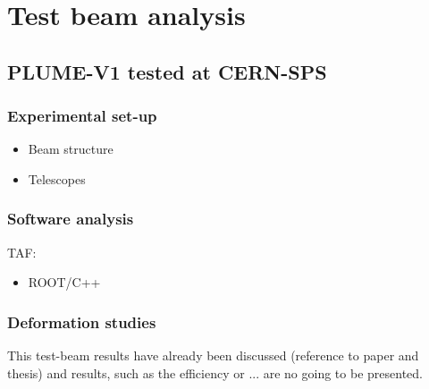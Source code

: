 \chapter{Test beam analysis}

  \section{PLUME-V1 tested at CERN-SPS}
    \subsection{Experimental set-up}

     \begin{itemize}
       \item Beam structure
       \item Telescopes
     \end{itemize}

    \begin{figure}
    \end{figure}

    \subsection{Software analysis}

      TAF:
      \begin{itemize}
        \item ROOT/C++
      \end{itemize}

    \subsection{Deformation studies}
    
    This test-beam results have already been discussed (reference to paper and thesis) and results, such as the efficiency or ... are no going to be presented.

    \begin{figure}
    \end{figure}

    \begin{figure}
    \end{figure}

